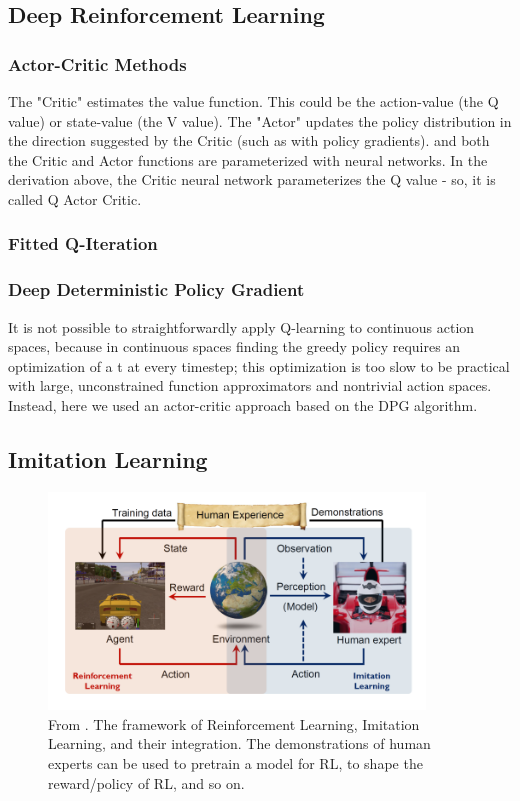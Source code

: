 \subsection{Deep Reinforcement Learning}

\subsubsection{Actor-Critic Methods}
The "Critic" estimates the value function. This could be the action-value (the Q value) or state-value (the V value).
The "Actor" updates the policy distribution in the direction suggested by the Critic (such as with policy gradients).
and both the Critic and Actor functions are parameterized with neural networks. In the derivation above, the Critic neural network parameterizes the Q value - so, it is called Q Actor Critic.
\subsubsection{Fitted Q-Iteration}

\subsubsection{Deep Deterministic Policy Gradient}
\label{ddpg}
It is not possible to straightforwardly apply Q-learning to continuous action spaces, because in continuous spaces finding the greedy policy requires an optimization of a t at every timestep; this optimization is too slow to be practical with large, unconstrained function approximators and nontrivial action spaces. Instead, here we used an actor-critic approach based on the DPG algorithm.


\subsection{Imitation Learning}
\begin{figure}[t]
 \centering
  \captionsetup{width=10cm}
  \includegraphics[width=10cm]{./img/cinesi}
  \caption{From \cite{cinesi}. The framework of Reinforcement Learning, Imitation Learning, and their integration. The demonstrations of human experts can be used to pretrain a model for RL, to shape the reward/policy of RL, and so on.}
   \label{fig:cinesi}
\end{figure}


